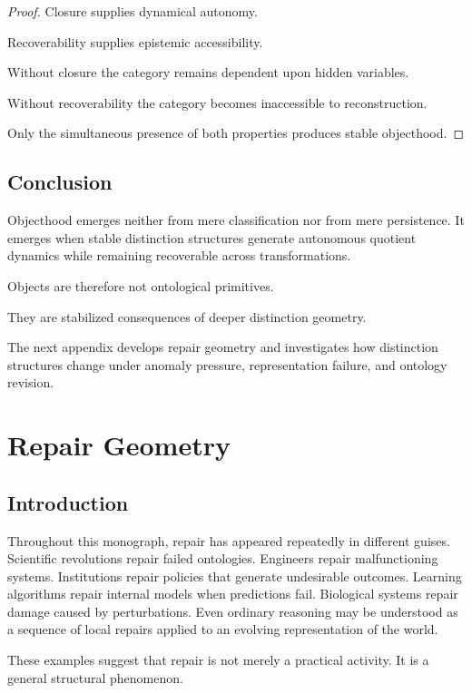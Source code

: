 \documentclass[11pt,oneside,openany]{book}
\begin{document}
\begin{proof}

Closure supplies dynamical autonomy.

Recoverability supplies epistemic accessibility.

Without closure the category remains dependent upon hidden variables.

Without recoverability the category becomes inaccessible to reconstruction.

Only the simultaneous presence of both properties produces stable objecthood.

\end{proof}

\section{Conclusion}

Objecthood emerges neither from mere classification nor from mere persistence. It emerges when stable distinction structures generate autonomous quotient dynamics while remaining recoverable across transformations.

Objects are therefore not ontological primitives.

They are stabilized consequences of deeper distinction geometry.

The next appendix develops repair geometry and investigates how distinction structures change under anomaly pressure, representation failure, and ontology revision.

\chapter{Repair Geometry}

\section{Introduction}

Throughout this monograph, repair has appeared repeatedly in different guises. Scientific revolutions repair failed ontologies. Engineers repair malfunctioning systems. Institutions repair policies that generate undesirable outcomes. Learning algorithms repair internal models when predictions fail. Biological systems repair damage caused by perturbations. Even ordinary reasoning may be understood as a sequence of local repairs applied to an evolving representation of the world.

These examples suggest that repair is not merely a practical activity. It is a general structural phenomenon.
\end{document}

